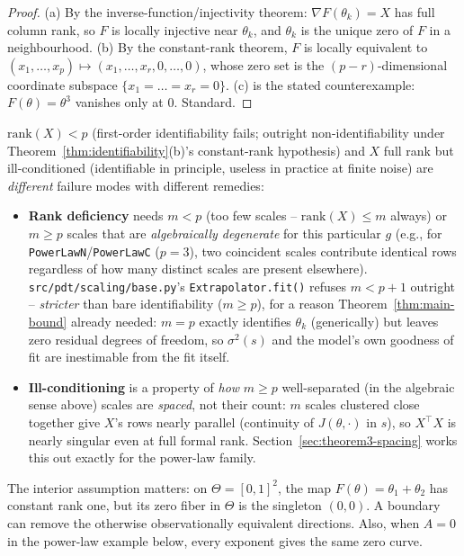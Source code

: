 \begin{proof}
(a) By the inverse-function/injectivity theorem: $\nabla F(\theta_k) = X$ has full column
rank, so $F$ is locally injective near $\theta_k$, and $\theta_k$ is the unique zero of $F$
in a neighbourhood. (b) By the constant-rank theorem, $F$ is locally equivalent to
$(x_1, \dots, x_p) \mapsto (x_1, \dots, x_r, 0, \dots, 0)$, whose zero set is the
$(p-r)$-dimensional coordinate subspace $\{x_1 = \dots = x_r = 0\}$. (c) is the stated
counterexample: $F(\theta) = \theta^3$ vanishes only at $0$. Standard.
\end{proof}

\begin{remark}
\label{rem:two-failure-modes}
$\mathrm{rank}(X) < p$ (first-order identifiability fails; outright
non-identifiability under Theorem~\ref{thm:identifiability}(b)'s constant-rank
hypothesis) and $X$ full rank but ill-conditioned (identifiable in principle, useless in practice at finite noise) are
\emph{different} failure modes with different remedies:
\begin{itemize}
  \item \textbf{Rank deficiency} needs $m < p$ (too few scales -- $\mathrm{rank}(X) \le
    m$ always) or $m \ge p$ scales that are \emph{algebraically degenerate} for this
    particular $g$ (e.g., for \texttt{PowerLawN}/\texttt{PowerLawC}
    ($p{=}3$), two coincident scales contribute identical rows regardless of how many
    distinct scales are present elsewhere). \texttt{src/pdt/scaling/base.py}'s
    \texttt{Extrapolator.fit()} refuses $m < p+1$ outright -- \emph{stricter} than bare
    identifiability ($m \ge p$), for a reason Theorem~\ref{thm:main-bound} already
    needed: $m = p$ exactly identifies $\theta_k$ (generically) but leaves zero residual
    degrees of freedom, so $\sigma^2(s)$ and the model's own goodness of fit are
    inestimable from the fit itself.
  \item \textbf{Ill-conditioning} is a property of \emph{how} $m \ge p$ well-separated
    (in the algebraic sense above) scales are \emph{spaced}, not their count: $m$
    scales clustered close together give $X$'s rows nearly parallel (continuity of
    $J(\theta,\cdot)$ in $s$), so $X^\top X$ is nearly singular even at full formal
    rank. Section~\ref{sec:theorem3-spacing} works this out exactly for the power-law
    family.
\end{itemize}
\end{remark}

The interior assumption matters: on $\Theta=[0,1]^2$, the map
$F(\theta)=\theta_1+\theta_2$ has constant rank one, but its zero fiber
in $\Theta$ is the singleton $(0,0)$. A boundary can remove the otherwise
observationally equivalent directions. Also, when $A=0$ in the power-law
example below, every exponent gives the same zero curve.

